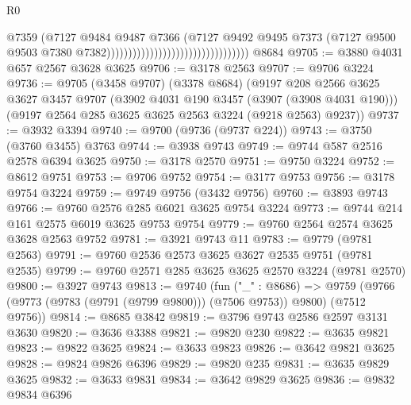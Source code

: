 \begin{lexlean}{R0}
\begin{coremodule}
                                                                @7359
                                                                (@7127
                                                                  @9484
                                                                  @9487
                                                                  @7366
                                                                  (@7127
                                                                    @9492
                                                                    @9495
                                                                    @7373
                                                                    (@7127
                                                                      @9500
                                                                      @9503
                                                                      @7380
                                                                      @7382)))))))))))))))))))))))))))))))))
    @8684
@9705 := @3880 @4031 @657 @2567 @3628 @3625
@9706 := @3178 @2563
@9707 := @9706 @3224
@9736 := @9705
    (@3458 @9707)
    (@3378 @8684)
    (@9197
      @208
      @2566
      @3625
      @3627
      @3457
      @9707
      (@3902 @4031 @190 @3457 (@3907 (@3908 @4031 @190)))
      (@9197 @2564 @285 @3625 @3625 @2563 @3224 (@9218 @2563) @9237))
@9737 := @3932 @3394
@9740 := @9700 (@9736 (@9737 @224))
@9743 := @3750 (@3760 @3455) @3763
@9744 := @3938 @9743
@9749 := @9744 @587 @2516 @2578 @6394 @3625
@9750 := @3178 @2570
@9751 := @9750 @3224
@9752 := @8612 @9751
@9753 := @9706 @9752
@9754 := @3177 @9753
@9756 := @3178 @9754 @3224
@9759 := @9749 @9756 (@3432 @9756)
@9760 := @3893 @9743
@9766 := @9760 @2576 @285 @6021 @3625 @9754 @3224
@9773 := @9744 @214 @161 @2575 @6019 @3625 @9753 @9754
@9779 := @9760 @2564 @2574 @3625 @3628 @2563 @9752
@9781 := @3921 @9743 @11
@9783 := @9779 (@9781 @2563)
@9791 := @9760 @2536 @2573 @3625 @3627 @2535 @9751 (@9781 @2535)
@9799 := @9760 @2571 @285 @3625 @3625 @2570 @3224 (@9781 @2570)
@9800 := @3927 @9743
@9813 := @9740
    (fun ("_" : @8686) =>
    @9759 (@9766 (@9773 (@9783 (@9791 (@9799 @9800))) (@7506 @9753)) @9800) (@7512 @9756))
@9814 := @8685 @3842
@9819 := @3796 @9743 @2586 @2597 @3131 @3630
@9820 := @3636 @3388
@9821 := @9820 @230
@9822 := @3635 @9821
@9823 := @9822 @3625
@9824 := @3633 @9823
@9826 := @3642 @9821 @3625
@9828 := @9824 @9826 @6396
@9829 := @9820 @235
@9831 := @3635 @9829 @3625
@9832 := @3633 @9831
@9834 := @3642 @9829 @3625
@9836 := @9832 @9834 @6396

\end{coremodule}
\end{lexlean}

